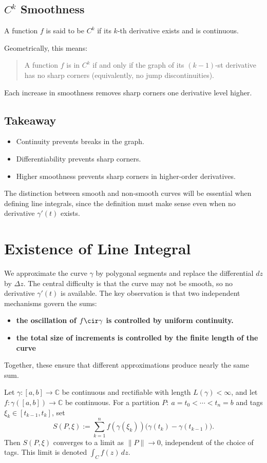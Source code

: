 \documentclass{article}
\begin{document}
\subsection{$C^k$ Smoothness}
A function $f$ is said to be \emph{$C^k$} if its $k$-th derivative exists and is
continuous.

Geometrically, this means:
\begin{quote}
A function $f$ is in $C^k$ if and only if the graph of its $(k-1)$-st derivative
has no sharp corners (equivalently, no jump discontinuities).
\end{quote}

Each increase in smoothness removes sharp corners one derivative level higher.

\subsection{Takeaway}
\begin{itemize}
\item Continuity prevents breaks in the graph.
\item Differentiability prevents sharp corners.
\item Higher smoothness prevents sharp corners in higher-order derivatives.
\end{itemize}
The distinction between smooth and non-smooth curves will be essential when defining line integrals, since the definition must make sense even when no derivative $\gamma'(t)$ exists.
\section{Existence of Line Integral}
We approximate the curve $\gamma$ by polygonal segments and replace the differential $dz$ by $\Delta z$. The central difficulty is that the curve may not be smooth, so no derivative $\gamma'(t)$ is available. The key observation is that two independent mechanisms govern the sums:
\begin{itemize}
    \item \textbf{the oscillation of $f\cir \gamma$ is controlled by uniform continuity.}
    \item \textbf{the total size of increments is controlled by the finite length of the curve}
\end{itemize}
Together, these ensure that different approximations produce nearly the same sum.
\begin{theorem}
Let $\gamma:[a,b]\to\mathbb C$ be continuous and rectifiable with length $L(\gamma)<\infty$,
and let $f:\gamma([a,b])\to\mathbb C$ be continuous. For a partition
$P:\ a=t_0<\cdots<t_n=b$ and tags $\xi_k\in[t_{k-1},t_k]$, set
\[
S(P,\xi):=\sum_{k=1}^n f(\gamma(\xi_k))\big(\gamma(t_k)-\gamma(t_{k-1})\big).
\]
Then $S(P,\xi)$ converges to a limit as $\|P\|\to 0$, independent of the choice of tags.
This limit is denoted $\int_C f(z)\,dz$.
\end{theorem}
\end{document}
